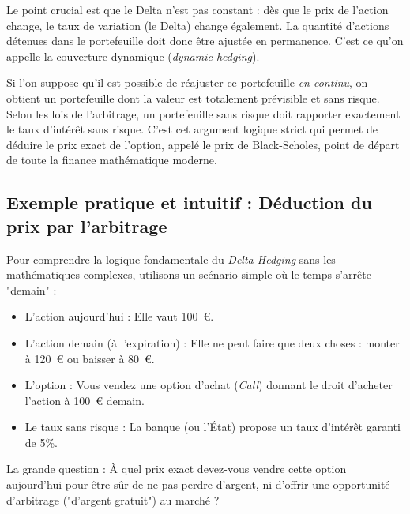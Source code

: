 \begin{remarquebox}
Le point crucial est que le Delta n'est pas constant : dès que le prix de l'action change, le taux de variation (le Delta) change également. La quantité d'actions détenues dans le portefeuille doit donc être ajustée en permanence. C'est ce qu'on appelle la couverture dynamique (\textit{dynamic hedging}).

Si l'on suppose qu'il est possible de réajuster ce portefeuille \textit{en continu}, on obtient un portefeuille dont la valeur est totalement prévisible et sans risque. Selon les lois de l'arbitrage, un portefeuille sans risque doit rapporter exactement le taux d'intérêt sans risque. C'est cet argument logique strict qui permet de déduire le prix exact de l'option, appelé le prix de Black-Scholes, point de départ de toute la finance mathématique moderne.
\end{remarquebox}

\subsection{Exemple pratique et intuitif : Déduction du prix par l'arbitrage}

\begin{examplebox}
Pour comprendre la logique fondamentale du \textit{Delta Hedging} sans les mathématiques complexes, utilisons un scénario simple où le temps s'arrête "demain" :
\begin{itemize}[label=$\rightarrow$]
    \item L'action aujourd'hui : Elle vaut 100~€.
    \item L'action demain (à l'expiration) : Elle ne peut faire que deux choses : monter à 120~€ ou baisser à 80~€.
    \item L'option : Vous vendez une option d'achat (\textit{Call}) donnant le droit d'acheter l'action à 100~€ demain.
    \item Le taux sans risque : La banque (ou l'État) propose un taux d'intérêt garanti de 5\%.
\end{itemize}
La grande question : À quel prix exact devez-vous vendre cette option aujourd'hui pour être sûr de ne pas perdre d'argent, ni d'offrir une opportunité d'arbitrage ("d'argent gratuit") au marché ?
\end{examplebox}

\newpage

